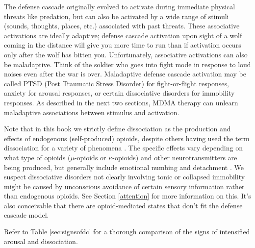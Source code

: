 \documentclass[12pt,letterpaper]{book}
\begin{document}
The defense cascade originally evolved to activate during immediate physical threats like predation, but can also be activated by a wide range of stimuli (sounds, thoughts, places, etc.) associated with past threats. These associative activations are ideally adaptive; defense cascade activation upon sight of a wolf coming in the distance will give you more time to run than if activation occurs only after the wolf has bitten you. Unfortunately, associative activations can also be maladaptive. Think of the soldier who goes into fight mode in response to loud noises even after the war is over. Maladaptive defense cascade activation may be called PTSD (Post Traumatic Stress Disorder) for fight-or-flight responses, anxiety for arousal responses, or certain dissociative disorders for immobility responses. As described in the next two sections, MDMA therapy can unlearn maladaptive associations between stimulus and activation.

Note that in this book we strictly define dissociation as the production and effects of endogenous (self-produced) opioids, despite others having used the term dissociation for a variety of phenomena \cite{kozlowskaDefenseCascade}. The specific effects vary depending on what type of opioids ($\mu$-opioids or $\kappa$-opioids) and other neurotransmitters are being produced, but generally include emotional numbing and detachment \cite{kozlowskaDefenseCascade,lanius2018review}. We suspect dissociative disorders not clearly involving tonic or collapsed immobility might be caused by unconscious avoidance of certain sensory information rather than endogenous opioids. See Section \ref{attention} for more information on this. It's also conceivable that there are opioid-mediated states that don't fit the defense cascade model.

Refer to Table \ref{sec:signsofdc} for a thorough comparison of the signs of intensified arousal and dissociation.
\end{document}
